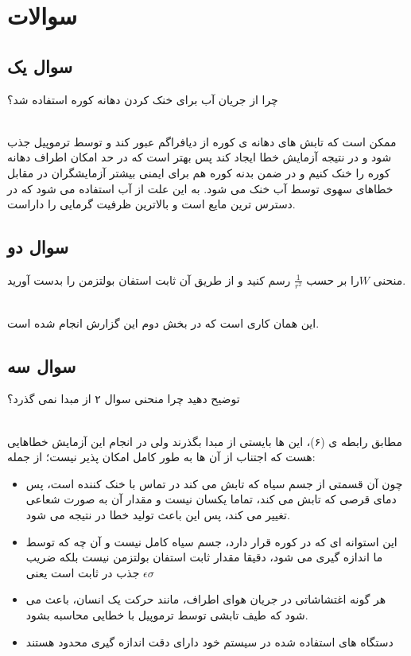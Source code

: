 \documentclass{article}
\begin{document}
\section{سوالات}
\subsection{سوال یک}
چرا از جریان آب برای خنک کردن دهانه کوره استفاده شد؟

\noindent\\
ممکن است که تابش های دهانه ی کوره از دیافراگم عبور کند و توسط ترموپیل جذب شود و در نتیجه آزمایش خطا ایجاد کند پس بهتر است که در حد امکان اطراف دهانه کوره را خنک کنیم و در ضمن بدنه کوره هم برای ایمنی بیشتر آزمایشگران در مقابل خطاهای سهوی توسط آب خنک می شود. به این علت از آب استفاده می شود که در دسترس ترین مایع است و بالاترین ظرفیت گرمایی را داراست.

\subsection{سوال دو}
منحنی $W$‌را بر حسب  
$\frac{1}{r^2}$
رسم کنید و از طریق آن ثابت استفان بولتزمن را بدست آورید.

\noindent\\
 این همان کاری است که در بخش دوم این گزارش انجام شده است.
 

\subsection{سوال سه}
توضیح دهید چرا منحنی سوال ۲ از مبدا نمی گذرد؟

\noindent\\

مطابق رابطه ی (۶)، این ها بایستی از مبدا بگذرند ولی در انجام این آزمایش خطاهایی هست که اجتناب از آن ها به طور کامل امکان پذیر نیست؛ از جمله:
\begin{itemize}
	\item چون آن قسمتی از جسم سیاه که تابش می کند در تماس با خنک کننده است، پس دمای قرصی که تابش می کند، تماما یکسان نیست و مقدار آن به صورت شعاعی تغییر می کند، پس این باعث تولید خطا در نتیجه می شود.
	\item این استوانه ای که در کوره قرار دارد، جسم سیاه کامل نیست و آن چه که توسط ما اندازه گیری می شود، دقیقا مقدار ثابت استفان بولتزمن نیست بلکه ضریب جذب در ثابت است یعنی 
	$\epsilon\sigma$
	\item هر گونه اغتشاشاتی در جریان هوای اطراف، مانند حرکت یک انسان، باعث می شود که طیف تابشی توسط ترموپیل با خطایی محاسبه بشود.
	\item دستگاه های استفاده شده در سیستم خود دارای دقت اندازه گیری محدود هستند
\end{itemize}
 
\end{document}
